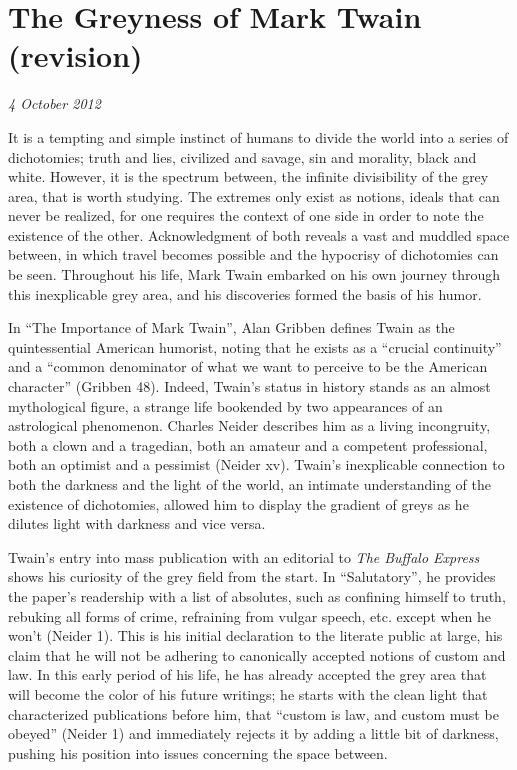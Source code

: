 \section{The Greyness of Mark Twain (revision)}

\textit{4 October 2012}

It is a tempting and simple instinct of humans to divide the world into a series
of dichotomies; truth and lies, civilized and savage, sin and morality, black
and white. However, it is the spectrum between, the infinite divisibility of the
grey area, that is worth studying. The extremes only exist as notions, ideals
that can never be realized, for one requires the context of one side in order to
note the existence of the other. Acknowledgment of both reveals a vast and
muddled space between, in which travel becomes possible and the hypocrisy of
dichotomies can be seen. Throughout his life, Mark Twain embarked on his own
journey through this inexplicable grey area, and his discoveries formed the
basis of his humor.

In ``The Importance of Mark Twain'', Alan Gribben defines Twain as the
quintessential American humorist, noting that he exists as a ``crucial
continuity'' and a ``common denominator of what we want to perceive to be the
American character'' (Gribben 48). Indeed, Twain's status in history stands as
an almost mythological figure, a strange life bookended by two appearances of an
astrological phenomenon. Charles Neider describes him as a living incongruity,
both a clown and a tragedian, both an amateur and a competent professional, both
an optimist and a pessimist (Neider xv). Twain's inexplicable connection to both
the darkness and the light of the world, an intimate understanding of the
existence of dichotomies, allowed him to display the gradient of greys as he
dilutes light with darkness and vice versa.

Twain's entry into mass publication with an editorial to \textit{The Buffalo
Express} shows his curiosity of the grey field from the start. In
``Salutatory'', he provides the paper's readership with a list of absolutes,
such as confining himself to truth, rebuking all forms of crime, refraining from
vulgar speech, etc. except when he won't (Neider 1). This is his initial
declaration to the literate public at large, his claim that he will not be
adhering to canonically accepted notions of custom and  law. In this early
period of his life, he has already accepted the grey area that will become the
color of his future writings; he starts with the clean light that characterized
publications before him, that ``custom is law, and custom must be obeyed''
(Neider 1) and immediately rejects it by adding a little bit of darkness,
pushing his position into issues concerning the space between.

